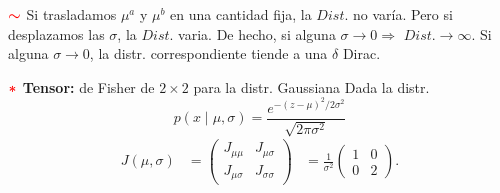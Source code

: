 \documentclass[%
 reprint,
 amsmath,amssymb,
 aps,
]{revtex4-1}
\begin{document}
\textbf{$\textcolor{red}{\color{red}{\boldsymbol{\sim}}}$} Si trasladamos $\mu^{a}$ y $\mu^{b}$ en una cantidad fija, la $Dist.$ no varía. Pero si desplazamos las $\sigma$, la $Dist.$ varia. De hecho, si alguna $\sigma \rightarrow 0 \Rightarrow$ $Dist. \rightarrow \infty$. Si alguna $\sigma \rightarrow 0$, la distr. correspondiente tiende a una $\delta$ Dirac.

\textbf{$\textcolor{red}{\color{red}{\boldsymbol{*}}}$ Tensor:} 
de Fisher de $2 \times 2$ para la distr. Gaussiana
Dada la distr.
$$
p(x \mid \mu, \sigma)=\frac{e^{-(z-\mu)^{2} / 2 \sigma^{2}}}{\sqrt{2 \pi \sigma^{2}}}
$$
$$
\begin{aligned}
J(\mu, \sigma) &
=
\left(\begin{array}{ll}
J_{\mu \mu} & J_{\mu \sigma} \\
J_{\mu \sigma} & J_{\sigma \sigma}
\end{array}\right)
&
=
\frac{1}{\sigma^{2}}\left(\begin{array}{ll}
1 & 0 \\
0 & 2
\end{array}\right) .
\end{aligned}
$$
\end{document}
